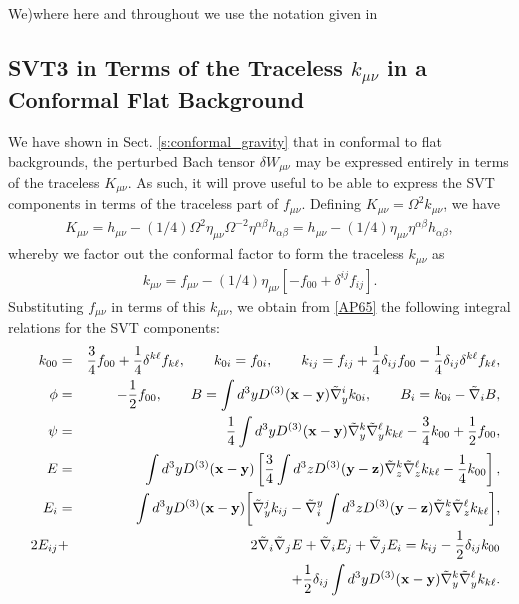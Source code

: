 We)where here and throughout we use the notation given in \cite{weinberg_1972}

\subsection{SVT3 in Terms of the Traceless $k_{\mu\nu}$ in a Conformal Flat Background}
\label{ss:svt3_in_terms_of_k_mu_nu}
We have shown in Sect. \ref{s:conformal_gravity} that in conformal to flat backgrounds, the perturbed Bach tensor $\delta W_{\mu\nu}$ may be expressed entirely in terms of the traceless $K_{\mu\nu}$. As such, it will prove useful to be able to express the SVT components in terms of the traceless part of $f_{\mu\nu}$. Defining $K_{\mu\nu}=\Omega^2k_{\mu\nu}$, we have
\begin{eqnarray}
K_{\mu\nu}=h_{\mu\nu}-(1/4)\Omega^2\eta_{\mu\nu}\Omega^{-2}\eta^{\alpha\beta}h_{\alpha\beta}=h_{\mu\nu}-(1/4)\eta_{\mu\nu}\eta^{\alpha\beta}h_{\alpha\beta},
\end{eqnarray}
whereby we factor out the conformal factor to form the traceless $k_{\mu\nu}$ as
\begin{eqnarray}
k_{\mu\nu}=f_{\mu\nu}-(1/4)\eta_{\mu\nu}[-f_{00}+\delta^{ij}f_{ij}].
\end{eqnarray}
%
Substituting $f_{\mu\nu}$ in terms of this $k_{\mu\nu}$, we obtain from \eqref{AP65} the following integral relations for the SVT components:
\begin{eqnarray}
k_{00}&=&\frac{3}{4}f_{00}+\frac{1}{4}\delta^{k\ell}f_{k\ell},\qquad k_{0i}=f_{0i},\qquad k_{ij}=f_{ij}+\frac{1}{4}\delta_{ij}f_{00}-\frac{1}{4}\delta_{ij}\delta^{k\ell}f_{k\ell},
\nonumber\\
\phi&=&-\frac{1}{2}f_{00},\qquad
B=\int d^3yD^{(3)}(\mathbf{x}-\mathbf{y})\tilde{\nabla}_y^ik_{0i},\qquad B_i=k_{0i}-\tilde{\nabla}_iB,
\nonumber\\
\psi&=&\frac{1}{4}\int d^3yD^{(3)}(\mathbf{x}-\mathbf{y})\tilde{\nabla}_y^k\tilde{\nabla}_y^{\ell}k_{k\ell}-\frac{3}{4}k_{00}+\frac{1}{2}f_{00},
\nonumber\\
\qquad
E&=&\int d^3yD^{(3)}(\mathbf{x}-\mathbf{y})\left[\frac{3}{4}\int d^3zD^{(3)}(\mathbf{y}-\mathbf{z})\tilde{\nabla}_z^k\tilde{\nabla}_z^{\ell}k_{k\ell}-\frac{1}{4}k_{00}\right],
\nonumber\\
E_i&=&\int d^3yD^{(3)}(\mathbf{x}-\mathbf{y})\bigg{[}\tilde{\nabla}_y^jk_{ij}
-\tilde{\nabla}^y_i\int d^3zD^{(3)}(\mathbf{y}-\mathbf{z})\tilde{\nabla}_z^k\tilde{\nabla}_z^{\ell}k_{k\ell}\bigg{]},
\nonumber\\
2E_{ij}&+&2\tilde{\nabla}_i\tilde{\nabla}_j E +\tilde{\nabla}_i E_j +\tilde{\nabla}_j E_i
=k_{ij}-\frac{1}{2}\delta_{ij}k_{00}
\nonumber\\
&&\qquad\qquad\qquad\qquad\qquad\qquad+\frac{1}{2}\delta_{ij}\int d^3yD^{(3)}(\mathbf{x}-\mathbf{y})\tilde{\nabla}_y^k\tilde{\nabla}_y^{\ell}k_{k\ell}.
\label{AP66}
\end{eqnarray}
